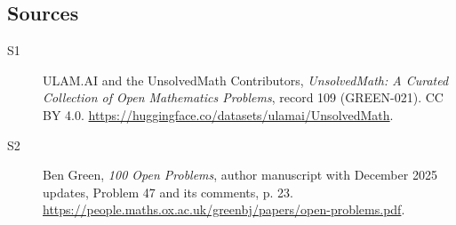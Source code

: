 \documentclass[11pt]{article}
\begin{document}
\subsection{Sources}
\begin{description}
\item[\hypertarget{source:109:1}{S1}] ULAM.AI and the UnsolvedMath Contributors, \emph{UnsolvedMath: A Curated Collection of Open Mathematics Problems}, record 109 (GREEN-021). CC BY 4.0. \url{https://huggingface.co/datasets/ulamai/UnsolvedMath}.
\item[\hypertarget{source:109:2}{S2}] Ben Green, \emph{100 Open Problems}, author manuscript with December 2025 updates, Problem 47 and its comments, p. 23. \url{https://people.maths.ox.ac.uk/greenbj/papers/open-problems.pdf}.
\end{description}
\label{end:109}
\end{document}
